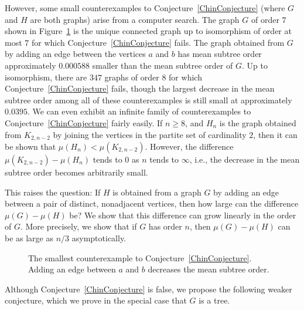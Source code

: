 \documentclass[12pt]{article}
\newcommand{\vertex}{\node[vertex]}
\theoremstyle{definition}
\begin{document}
However, some small counterexamples to Conjecture~\ref{ChinConjecture} (where $G$ and $H$ are both graphs) arise from a computer search.  The graph $G$ of order $7$ shown in Figure~\ref{CounterexampleFigure} is the unique connected graph up to isomorphism of order at most $7$ for which Conjecture~\ref{ChinConjecture} fails.  The graph obtained from $G$ by adding an edge between the vertices $a$ and $b$ has mean subtree order approximately $0.000588$ smaller than the mean subtree order of $G$.  Up to isomorphism, there are $347$ graphs of order $8$ for which Conjecture~\ref{ChinConjecture} fails, though the largest decrease in the mean subtree order among all of these counterexamples is still small at approximately $0.0395$. We can even exhibit an infinite family of counterexamples to Conjecture~\ref{ChinConjecture} fairly easily.  If $n\geq 8$, and $H_n$ is the graph obtained from $K_{2,n-2}$ by joining the vertices in the partite set of cardinality $2$, then it can be shown that $\mu(H_n)<\mu(K_{2,n-2})$. However, the difference $\mu(K_{2,n-2})-\mu(H_n)$ tends to $0$ as $n$ tends to $\infty$, i.e., the decrease in the mean subtree order becomes arbitrarily small.

This raises the question: If $H$ is obtained from a graph $G$ by adding an edge between a pair of distinct, nonadjacent vertices, then how large can the difference $\mu(G)-\mu(H)$ be? We show that this difference can grow linearly in the order of $G$. More precisely, we show that  if $G$ has order $n$, then $\mu(G)-\mu(H)$ can be as large as $n/3$ asymptotically.

\begin{figure}
    \centering
    \caption{The smallest counterexample to Conjecture~\ref{ChinConjecture}.  Adding an edge between $a$ and $b$ decreases the mean subtree order.}
    \label{CounterexampleFigure}
\end{figure}

Although Conjecture~\ref{ChinConjecture} is false, we propose the following weaker conjecture, which we prove in the special case that $G$ is a tree.
\end{document}
